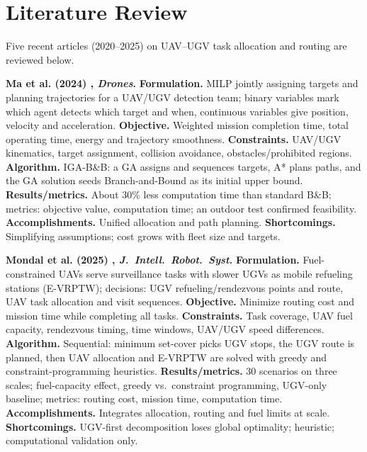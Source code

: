 \chapter{Literature Review}\label{chap:background}
Five recent articles (2020--2025) on UAV--UGV task allocation and routing are reviewed below.
 
\textbf{Ma et al. (2024) \cite{ma}, \emph{Drones}.} \textbf{Formulation.} MILP jointly assigning targets and planning trajectories for a UAV/UGV detection team; binary variables mark which agent detects which target and when, continuous variables give position, velocity and acceleration. \textbf{Objective.} Weighted mission completion time, total operating time, energy and trajectory smoothness. \textbf{Constraints.} UAV/UGV kinematics, target assignment, collision avoidance, obstacles/prohibited regions. \textbf{Algorithm.} IGA-B\&B: a GA assigns and sequences targets, A* plans paths, and the GA solution seeds Branch-and-Bound as its initial upper bound. \textbf{Results/metrics.} About 30\% less computation time than standard B\&B; metrics: objective value, computation time; an outdoor test confirmed feasibility. \textbf{Accomplishments.} Unified allocation and path planning. \textbf{Shortcomings.} Simplifying assumptions; cost grows with fleet size and targets.
 
\textbf{Mondal et al. (2025) \cite{mondal}, \emph{J.\ Intell.\ Robot.\ Syst.}} \textbf{Formulation.} Fuel-constrained UAVs serve surveillance tasks with slower UGVs as mobile refueling stations (E-VRPTW); decisions: UGV refueling/rendezvous points and route, UAV task allocation and visit sequences. \textbf{Objective.} Minimize routing cost and mission time while completing all tasks. \textbf{Constraints.} Task coverage, UAV fuel capacity, rendezvous timing, time windows, UAV/UGV speed differences. \textbf{Algorithm.} Sequential: minimum set-cover picks UGV stops, the UGV route is planned, then UAV allocation and E-VRPTW are solved with greedy and constraint-programming heuristics. \textbf{Results/metrics.} 30 scenarios on three scales; fuel-capacity effect, greedy vs.\ constraint programming, UGV-only baseline; metrics: routing cost, mission time, computation time. \textbf{Accomplishments.} Integrates allocation, routing and fuel limits at scale. \textbf{Shortcomings.} UGV-first decomposition loses global optimality; heuristic; computational validation only.
 
